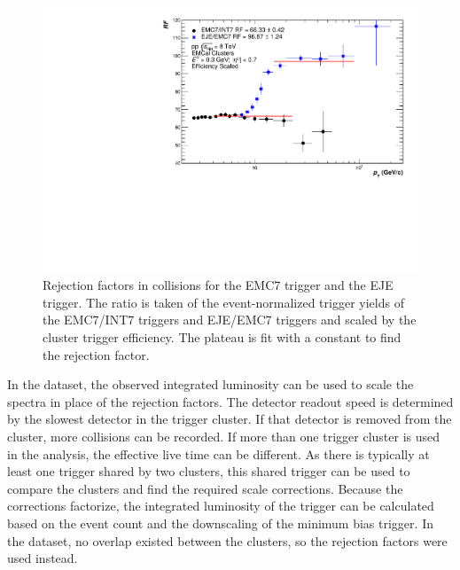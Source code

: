 \begin{figure}[hbt!]
    \centering
    \includegraphics[width=15cm]{figures/RejectionFactors/RF_R02_Default.pdf}
    \caption{Rejection factors in \pp collisions for the EMC7 trigger and the EJE trigger. The ratio is taken of the event-normalized trigger yields of the EMC7/INT7 triggers and EJE/EMC7 triggers and scaled by the cluster trigger efficiency. The plateau is fit with a constant to find the rejection factor.}
    \label{fig:RejectionFactors}
\end{figure}

In the \pPb dataset, the observed integrated luminosity can be used to scale the spectra in place of the rejection factors. The detector readout speed is determined by the slowest detector in the trigger cluster. If that detector is removed from the cluster, more collisions can be recorded. If more than one trigger cluster is used in the analysis, the effective live time can be different. As there is typically at least one trigger shared by two clusters, this shared trigger can be used to compare the clusters and find the required scale corrections. Because the corrections factorize, the integrated luminosity of the trigger can be calculated based on the event count and the downscaling of the minimum bias trigger. In the \pp dataset, no overlap existed between the clusters, so the rejection factors were used instead.


